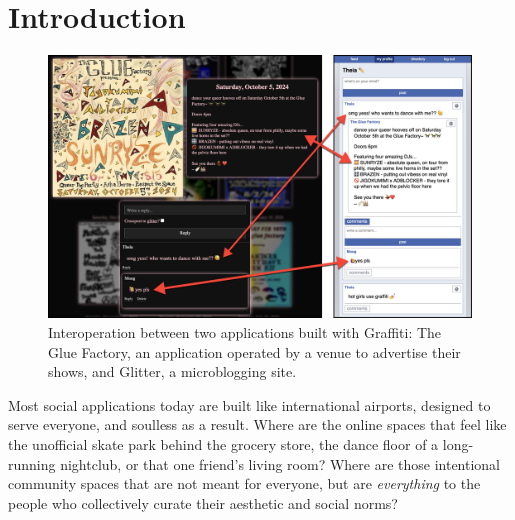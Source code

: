 \section{Introduction}

\begin{figure}[h]
    \centering
    \includegraphics[width=\textwidth]{paper/figures/gloof-and-glitter.jpg}
    \caption{
    Interoperation between two applications built with Graffiti:
    The Glue Factory, an application operated by a venue to advertise their shows,
    and Glitter, a microblogging site.
    }
    \label{case-studies:fig:gloof-and-glitter}
\end{figure}

Most social applications today are built like international airports,
designed to serve everyone, and soulless as a result.
Where are the online spaces that feel like
the unofficial skate park behind the grocery store,
the dance floor of a long-running nightclub,
or that one friend's living room?
Where are those intentional community spaces that
are not meant for everyone,
but are \emph{everything} to the people
who collectively curate their aesthetic and social norms?

